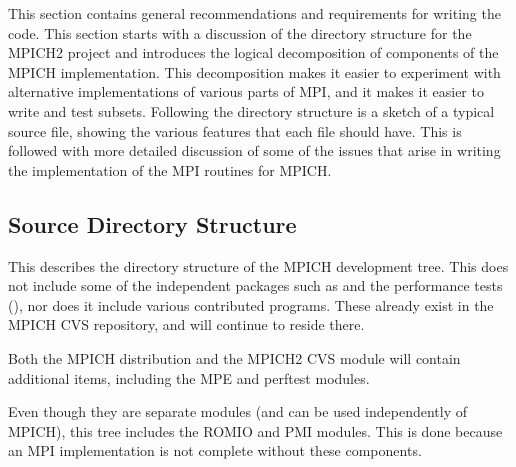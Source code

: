 \documentclass{article}
\begin{document}
This section contains general recommendations and requirements for
writing the code.  
This section starts with a discussion of the directory structure for the
MPICH2 project and introduces the logical decomposition of components of the
MPICH implementation.  This decomposition makes it easier to experiment with
alternative implementations of various parts of MPI, and it makes it easier to
write and test subsets.
Following the directory structure is a sketch of a typical source file,
showing the various features that each file should have.  This is followed
with more detailed discussion of some of the issues that arise in writing the
implementation of the MPI routines for MPICH.

\subsection{Source Directory Structure}
\label{sec:dir-structure}
This describes the directory structure of the MPICH development tree. 
This does not include some of the independent packages such as  and
the performance tests (), nor does it include various
contributed programs.  These already exist in the MPICH CVS repository, and
will continue to reside there.

Both the MPICH distribution and the MPICH2 CVS module will contain additional
items, including the MPE and perftest modules.  

Even though they are separate modules (and can be used independently
of MPICH), this tree includes the ROMIO and PMI modules.  This is done
because an MPI implementation is not complete without these components.
\end{document}
